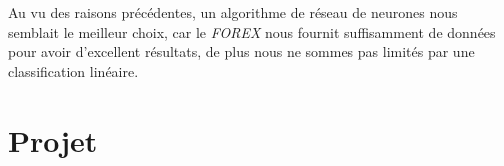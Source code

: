 \documentclass[a4paper, 11pt]{article}
\begin{document}
Au vu des raisons précédentes, un algorithme de réseau de neurones nous semblait le meilleur choix, car le \textit{FOREX} nous
fournit suffisamment de données pour avoir d'excellent résultats, de plus nous ne sommes pas limités par une classification linéaire.


\newpage
\section{Projet}
\newpage



\nocite{*}

\end{document}
